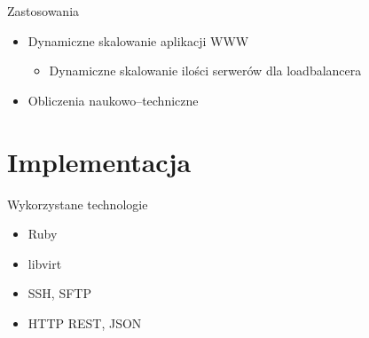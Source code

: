 \documentclass{beamer}
\begin{document}
\begin{frame}{Zastosowania}
  \begin{itemize}
    \item Dynamiczne skalowanie aplikacji WWW
      \begin{itemize}
        \item Dynamiczne skalowanie ilości serwerów dla loadbalancera
      \end{itemize}
    \item Obliczenia naukowo–techniczne
  \end{itemize}
\end{frame}

\section{Implementacja}
\begin{frame}{Wykorzystane technologie}
  \begin{itemize}
    \item Ruby
    \item libvirt
    \item SSH, SFTP
    \item HTTP REST, JSON
  \end{itemize}
\end{frame}
\end{document}
